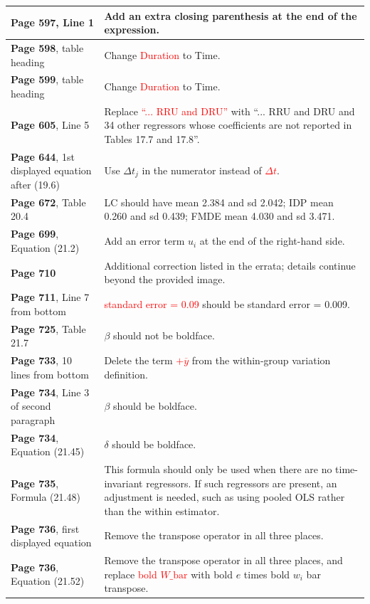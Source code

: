 \documentclass[10pt, a4paper]{article}
\newcommand{\red}[1]{\textcolor{red}{#1}}
\newcommand{\green}[1]{\textcolor{green!50!black}{#1}}
\begin{document}
\begin{longtable}{|R{.41\textwidth}|R{.57\textwidth}|}
	\textbf{Page 597}, Line 1 & Add an extra closing parenthesis at the end of the expression. \\ \hline
	\textbf{Page 598}, table heading & Change \red{Duration} to \green{Time}. \\ \hline
	\textbf{Page 599}, table heading & Change \red{Duration} to \green{Time}. \\ \hline
	\textbf{Page 605}, Line 5 & Replace \red{``... RRU and DRU''} with \green{``... RRU and DRU and 34 other regressors whose coefficients are not reported in Tables 17.7 and 17.8''}. \\ \hline
	\textbf{Page 644}, 1st displayed equation after (19.6) & Use \green{$\Delta t_j$} in the numerator instead of \red{$\Delta t$}. \\ \hline
	\textbf{Page 672}, Table 20.4 & LC should have mean 2.384 and sd 2.042; IDP mean 0.260 and sd 0.439; FMDE mean 4.030 and sd 3.471. \\ \hline
	\textbf{Page 699}, Equation (21.2) & Add an error term \green{$u_i$} at the end of the right-hand side. \\ \hline
	\textbf{Page 710} \hfill {} & Additional correction listed in the errata; details continue beyond the provided image. \\ \hline
	\textbf{Page 711}, Line 7 from bottom & \red{standard error = 0.09} should be \green{standard error = 0.009}. \\ \hline
	\textbf{Page 725}, Table 21.7 \hfill {} & \green{$\beta$} should not be boldface. \\ \hline
	\textbf{Page 733}, 10 lines from bottom & Delete the term \red{$+\overline y$} from the within-group variation definition. \\ \hline
	\textbf{Page 734}, Line 3 of second paragraph \hfill {} & \green{$\beta$} should be boldface. \\ \hline
	\textbf{Page 734}, Equation (21.45) \hfill {} & \green{$\delta$} should be boldface. \\ \hline
	\textbf{Page 735}, Formula (21.48) & This formula should only be used when there are no time-invariant regressors. If such regressors are present, an adjustment is needed, such as using pooled OLS rather than the within estimator. \\ \hline
	\textbf{Page 736}, first displayed equation & Remove the transpose operator in all three places. \\ \hline
	\textbf{Page 736}, Equation (21.52) & Remove the transpose operator in all three places, and replace \red{bold $W\_\text{bar}$} with \green{bold $e$ times bold $w_i$ bar transpose}. \\ \hline

\end{longtable}
\end{document}
